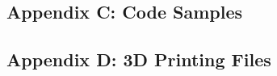 \documentclass{article}
\begin{document}
		
		\subsection{Appendix C: Code Samples}
		
		\subsection{Appendix D: 3D Printing Files}
	
\end{document}
